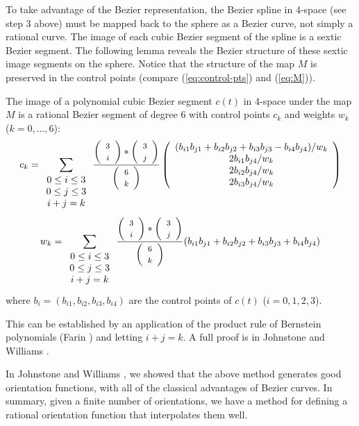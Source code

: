 To take advantage of the Bezier representation,
the Bezier spline in 4-space (see step 3 above)
must be mapped back to the sphere
as a Bezier curve, not simply a rational curve.
The image of each cubic Bezier segment of the spline is a sextic Bezier segment.
The following lemma reveals the Bezier structure of these sextic
image segments on the sphere.
Notice that the structure of the map $M$ is preserved in the control
points (compare (\ref{eq:control-pts}) and (\ref{eq:M})).

\begin{lemma}
\label{sextic}
The image of a polynomial cubic Bezier segment $c(t)$ in 4-space 
under the map $M$
is a rational Bezier segment of degree 6 with control points $c_k$
and weights $w_k$ ($k = 0, \ldots, 6$):
\begin{equation}
\label{eq:control-pts}
c_k = \sum_{\begin{array}{c} 0 \leq i \leq 3 \\ 
			     0 \leq j \leq 3 \\ 
			     i+j=k
			     \end{array}} 
        \frac{\left( \begin{array}{c} \mbox{\footnotesize{$3$}} \\ \mbox{\footnotesize{$i$}} \end{array} \right) * \left( \begin{array}{c} \mbox{\footnotesize{$3$}} \\ \mbox{\footnotesize{$j$}} \end{array} \right)}{\left( \begin{array}{c} \mbox{\footnotesize{$6$}} \\ \mbox{\footnotesize{$k$}} \end{array} \right)}
	\left( \begin{array}{c}
            (b_{i1} b_{j1} + b_{i2} b_{j2} + b_{i3} b_{j3} - b_{i4} b_{j4}) / w_k \\
            2b_{i1} b_{j4} / w_k \\
            2b_{i2} b_{j4} / w_k \\
            2b_{i3} b_{j4} / w_k
	\end{array} \right)
\end{equation}
\begin{equation}
w_k = \sum_{\begin{array}{c} 0 \leq i \leq 3 \\ 
			     0 \leq j \leq 3 \\ 
			     i+j=k
			     \end{array}}
        \frac{\left( \begin{array}{c} \mbox{\footnotesize{$3$}} \\ \mbox{\footnotesize{$i$}} \end{array} \right) * \left( \begin{array}{c} \mbox{\footnotesize{$3$}} \\ \mbox{\footnotesize{$j$}} \end{array} \right)}{\left( \begin{array}{c} \mbox{\footnotesize{$6$}} \\ \mbox{\footnotesize{$k$}} \end{array} \right)}
	(b_{i1} b_{j1} + b_{i2} b_{j2} + b_{i3} b_{j3} + b_{i4} b_{j4})
\end{equation}
where $b_i = (b_{i1},b_{i2},b_{i3},b_{i4})$ are the control points of $c(t)$
($i=0,1,2,3$).
\end{lemma}
\prf
This can be established by an application of the product rule
of Bernstein polynomials (Farin \cite{farin93})
and letting $i+j=k$.
A full proof is in Johnstone and Williams \cite{jjjimbo94a}.
\QED

In Johnstone and Williams \cite{jjjimbo94a}, we showed that the above
method generates good orientation functions, with all of the classical
advantages of Bezier curves.
In summary, given a finite number of orientations, we have a method
for defining a rational orientation function that interpolates them well.


